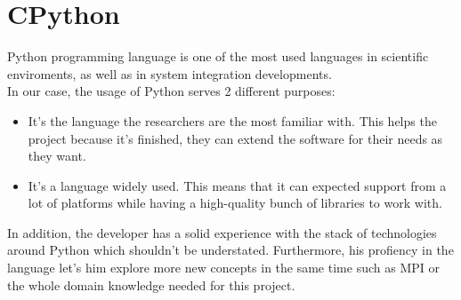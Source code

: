 \section{CPython}

Python\cite{Python} programming language is one of the most used languages
in scientific enviroments, as well as in system integration developments.\\

In our case, the usage of Python serves 2 different purposes:
\begin{itemize}
  \item It's the language the researchers are the most familiar with. This
  helps the project because it's finished, they can extend the
  software for their needs as they want.
  \item It's a language widely used. This means that it can expected support
  from a lot of platforms while having a high-quality bunch of libraries to work
  with.
\end{itemize}


In addition, the developer has a solid experience with the stack of
technologies around Python which shouldn't be understated. Furthermore, his
profiency in the language let's him explore more new concepts in the same time
such as MPI or the whole domain knowledge needed for this project.\\

